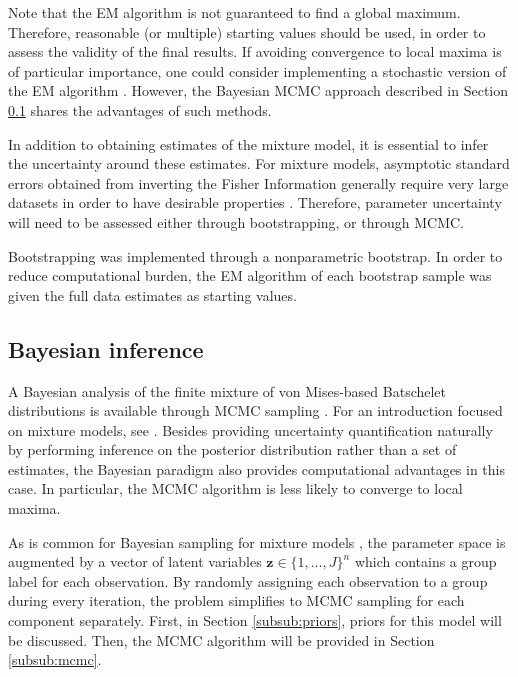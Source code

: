 Note that the EM algorithm is not guaranteed to find a global maximum. Therefore, reasonable (or multiple) starting values should be used, in order to assess the validity of the final results. If avoiding convergence to local maxima is of particular importance, one could consider implementing a stochastic version of the EM algorithm \citep{diebolt1996stochastic, nielsen2000stochastic}. However, the Bayesian MCMC approach described in Section \ref{sub:bayes} shares the advantages of such methods.

In addition to obtaining estimates of the mixture model, it is essential to infer the uncertainty around these estimates. For mixture models, asymptotic standard errors obtained from inverting the Fisher Information generally require very large datasets in order to have desirable properties \citep{mclachlan2004finite}. Therefore, parameter uncertainty will need to be assessed either through bootstrapping, or through MCMC.

Bootstrapping \citep{efron1994introduction} was implemented through a nonparametric bootstrap. In order to reduce computational burden, the EM algorithm of each bootstrap sample was given the full data estimates as starting values.

\subsection{Bayesian inference}
\label{sub:bayes}

A Bayesian analysis of the finite mixture of von Mises-based Batschelet distributions is available through MCMC sampling \citep{chib1995understanding, gilks1995markov}. For an introduction focused on mixture models, see \citet{fruhwirth2006finite}. Besides providing uncertainty quantification naturally by performing inference on the posterior distribution rather than a set of estimates, the Bayesian paradigm also provides computational advantages in this case. In particular, the MCMC algorithm is less likely to converge to local maxima.

As is common for Bayesian sampling for mixture models , the parameter space is augmented by a vector of latent variables \(\boldsymbol{z} \in \{1, \dots, J\}^n\) which contains a group label for each observation. By randomly assigning each observation to a group during every iteration, the problem simplifies to MCMC sampling for each component separately. First, in Section \ref{subsub:priors}, priors for this model will be discussed. Then, the MCMC algorithm will be provided in Section \ref{subsub:mcmc}.

